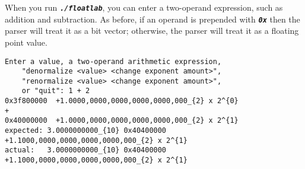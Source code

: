 When you run \texttt{\textbf{\textit{./floatlab}}}, you can enter a two-operand expression, such as addition and subtraction.
As before, if an operand is prepended with \texttt{\textbf{\textit{0x}}} then the parser will treat it as a bit vector;
otherwise, the parser will treat it as a floating point value.

\begin{verbatim}
Enter a value, a two-operand arithmetic expression,
    "denormalize <value> <change exponent amount>",
    "renormalize <value> <change exponent amount>",
    or "quit": 1 + 2
0x3f800000	+1.0000,0000,0000,0000,0000,000_{2} x 2^{0}
+
0x40000000	+1.0000,0000,0000,0000,0000,000_{2} x 2^{1}
expected: 3.0000000000_{10}	0x40400000	+1.1000,0000,0000,0000,0000,000_{2} x 2^{1}
actual:   3.0000000000_{10}	0x40400000	+1.1000,0000,0000,0000,0000,000_{2} x 2^{1}
\end{verbatim}

